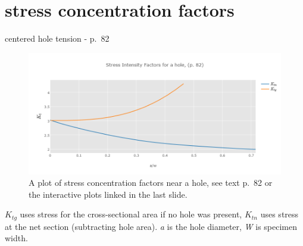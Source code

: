 \documentclass[
  letterpaper,
  ignorenonframetext,
  aspectratio=43,
  handout,
  12pt]{beamer}
\let\Oldincludegraphics\includegraphics
\renewcommand{\includegraphics}[2][]{\Oldincludegraphics[width=\textwidth,height=0.7\textheight,keepaspectratio]{#2}}
\begin{document}
\hypertarget{stress-concentration-factors}{%
\section{stress concentration
factors}\label{stress-concentration-factors}}

\begin{frame}{centered hole tension - p.~82}
\protect\hypertarget{centered-hole-tension---p.-82}{}
\begin{figure}
\centering
\includegraphics{../images/kt-hole.png}
\caption{A plot of stress concentration factors near a hole, see text
p.~82 or the interactive plots linked in the last slide.}
\end{figure}

\(K_{tg}\) uses stress for the cross-sectional area if no hole was
present, \(K_{tn}\) uses stress at the net section (subtracting hole
area). \emph{a} is the hole diameter, \emph{W} is specimen width.
\end{frame}
\end{document}
